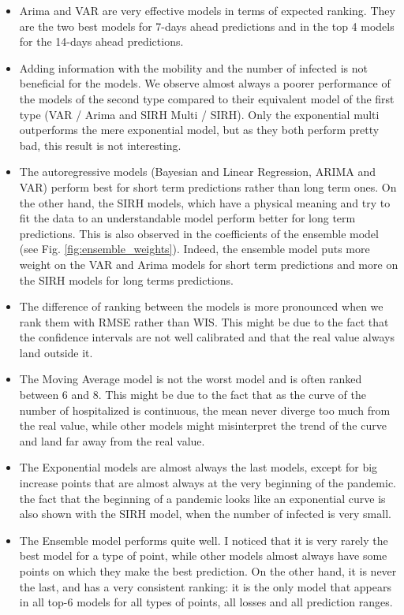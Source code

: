 \begin{itemize}
    \item Arima and VAR are very effective models in terms of expected ranking. They are the two best models for 7-days ahead predictions and in the top 4 models for the 14-days ahead predictions. 
    \item Adding information with the mobility and the number of infected is not beneficial for the models. We observe almost always a poorer performance of the models of the second type compared to their equivalent model of the first type (VAR / Arima and SIRH Multi / SIRH). Only the exponential multi outperforms the mere exponential model, but as they both perform pretty bad, this result is not interesting. 
    \item The autoregressive models (Bayesian and Linear Regression, ARIMA and VAR) perform best for short term predictions rather than long term ones. On the other hand, the SIRH models, which have a physical meaning and try to fit the data to an understandable model perform better for long term predictions. This is also observed in the coefficients of the ensemble model (see Fig. \ref{fig:ensemble_weights}). Indeed, the ensemble model puts more weight on the VAR and Arima models for short term predictions and more on the SIRH models for long terms predictions.  
    \item The difference of ranking between the models is more pronounced when we rank them with RMSE rather than WIS. This might be due to the fact that the confidence intervals are not well calibrated and that the real value always land outside it. 
    \item The Moving Average model is not the worst model and is often ranked between 6 and 8. This might be due to the fact that as the curve of the number of hospitalized is continuous, the mean never diverge too much from the real value, while other models might misinterpret the trend of the curve and land far away from the real value. 
    \item The Exponential models are almost always the last models, except for big increase points that are almost always at the very beginning of the pandemic. the fact that the beginning of a pandemic looks like an exponential curve is also shown with the SIRH model, when the number of infected is very small. 
    \item The Ensemble model performs quite well. I noticed that it is very rarely the best model for a type of point, while other models almost always have some points on which they make the best prediction. On the other hand, it is never the last, and has a very consistent ranking: it is the only model that appears in all top-6 models for all types of points, all losses and all prediction ranges.
\end{itemize}



